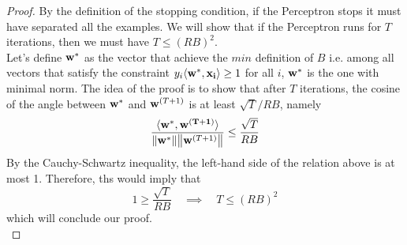 \documentclass[12pt]{report}
\theoremstyle{plain}
\newcommand\sprod[2]{\langle \vb{#1},\vb{#2}\rangle}
\begin{document}
\begin{flushleft}
\begin{proof}
	By the definition of the stopping condition, if the Perceptron stops it 
	must have separated all the examples. We will show that if the Perceptron 
	runs for $T$ iterations, then we must have $T\leq (RB)^2$.\\
	Let's define $\vb{w}^*$ as the vector that achieve the $min$ definition of 
	$B$ i.e. among all vectors that satisfy the constraint 
	$y_i\sprod{w^*}{x_i}\geq 1$ for all $i$, $\vb{w}^*$ is the one with minimal 
	norm. The idea of the proof is to show that after $T$ iterations, the 
	cosine of the angle between $\vb{w}^*$ and $\vb{w}^{(T+1)}$ is at least 
	$\sqrt{T}/RB$, namely
	\[ 
	\frac{\sprod{w^*}{w^{(T+1)}}}{\norm{\vb{w}^*}\norm{\vb{w}^{(T+1)}}}\leq\frac{\sqrt{T}}{RB}
	 \]
	By the Cauchy-Schwartz inequality, the left-hand side of the relation above 
	is at most 1. Therefore, ths would imply that
	\[ 1\geq\frac{\sqrt{T}}{RB} \quad\implies\quad T\leq (RB)^2 \]
	which will conclude our proof.\\
	

\end{proof}
\end{flushleft}
\end{document}
